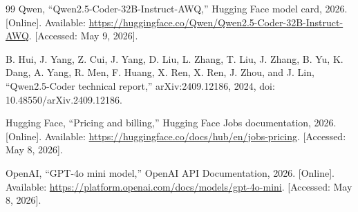 \documentclass[preprint,12pt]{elsarticle}
\begin{document}
\begin{thebibliography}{99}
 Qwen, ``Qwen2.5-Coder-32B-Instruct-AWQ,'' Hugging Face model card, 2026. [Online]. Available: \url{https://huggingface.co/Qwen/Qwen2.5-Coder-32B-Instruct-AWQ}. [Accessed: May 9, 2026].

 B. Hui, J. Yang, Z. Cui, J. Yang, D. Liu, L. Zhang, T. Liu, J. Zhang, B. Yu, K. Dang, A. Yang, R. Men, F. Huang, X. Ren, X. Ren, J. Zhou, and J. Lin, ``Qwen2.5-Coder technical report,'' arXiv:2409.12186, 2024, doi: 10.48550/arXiv.2409.12186.

 Hugging Face, ``Pricing and billing,'' Hugging Face Jobs documentation, 2026. [Online]. Available: \url{https://huggingface.co/docs/hub/en/jobs-pricing}. [Accessed: May 8, 2026].

 OpenAI, ``GPT-4o mini model,'' OpenAI API Documentation, 2026. [Online]. Available: \url{https://platform.openai.com/docs/models/gpt-4o-mini}. [Accessed: May 8, 2026].

\end{thebibliography}
\end{document}
